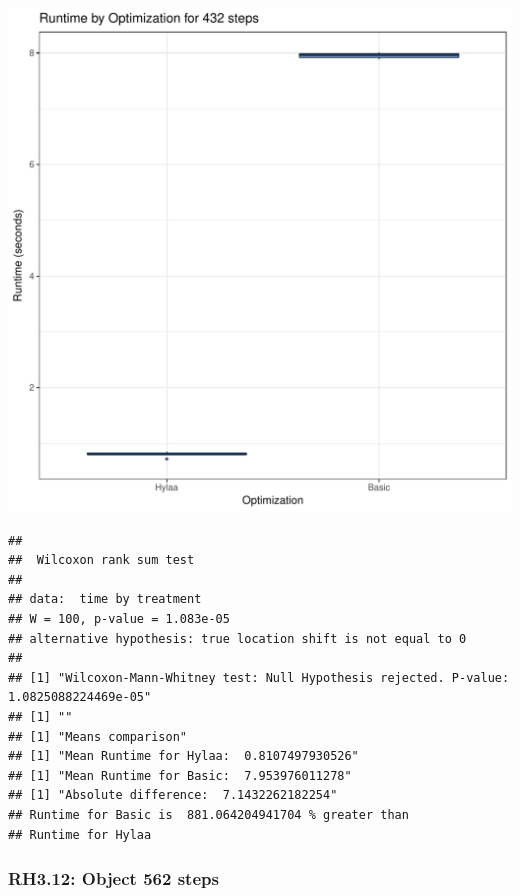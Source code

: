 \documentclass{article}\usepackage[]{graphicx}\usepackage[]{color}
\makeatletter
\def\maxwidth{ %
  \ifdim\Gin@nat@width>\linewidth
    \linewidth
  \else
    \Gin@nat@width
  \fi
}
\newenvironment{kframe}{%
 \def\at@end@of@kframe{}%
 \ifinner\ifhmode%
  \def\at@end@of@kframe{\end{minipage}}%
  \begin{minipage}{\columnwidth}%
 \fi\fi%
 \def\FrameCommand##1{\hskip\@totalleftmargin \hskip-\fboxsep
 \colorbox{shadecolor}{##1}\hskip-\fboxsep
     \hskip-\linewidth \hskip-\@totalleftmargin \hskip\columnwidth}%
 \MakeFramed {\advance\hsize-\width
   \@totalleftmargin\z@ \linewidth\hsize
   \@setminipage}}%
 {\par\unskip\endMakeFramed%
 \at@end@of@kframe}
\newenvironment{knitrout}{}{} %
\makeatother
\begin{document}
\begin{knitrout}
\color{fgcolor}
\includegraphics[width=\maxwidth]{figure/RH3_steps432-1} 
\begin{kframe}\begin{verbatim}
## 
## 	Wilcoxon rank sum test
## 
## data:  time by treatment
## W = 100, p-value = 1.083e-05
## alternative hypothesis: true location shift is not equal to 0
## 
## [1] "Wilcoxon-Mann-Whitney test: Null Hypothesis rejected. P-value: 1.0825088224469e-05"
## [1] ""
## [1] "Means comparison"
## [1] "Mean Runtime for Hylaa:  0.8107497930526"
## [1] "Mean Runtime for Basic:  7.953976011278"
## [1] "Absolute difference:  7.1432262182254"
## Runtime for Basic is  881.064204941704 % greater than 
## Runtime for Hylaa
\end{verbatim}
\end{kframe}
\end{knitrout}


\subsubsection{RH3.12: Object 562 steps}
\end{document}
